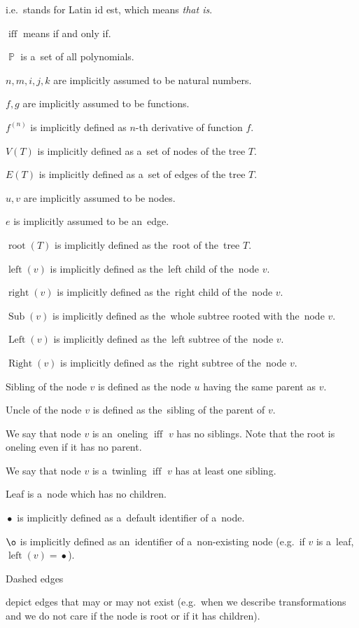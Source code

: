 \documentclass[final]{article}
\theoremstyle{definition}
\theoremstyle{definition}
\theoremstyle{remark}
\DeclareMathOperator{\textiff}{\text{iff}}
\DeclareMathOperator{\poly}{\mathbb{P}}
\DeclareMathOperator{\troot}{\text{root}}
\DeclareMathOperator{\tleft}{\text{left}}
\DeclareMathOperator{\tright}{\text{right}}
\DeclareMathOperator{\tLeft}{\text{Left}}
\DeclareMathOperator{\tRight}{\text{Right}}
\DeclareMathOperator{\tSub}{\text{Sub}}
\DeclareMathOperator{\n}{\bullet}
\DeclareMathOperator{\no}{\o}
\begin{document}
i.e.~stands for Latin id est, which means \textit{that is}.

\(\textiff\) means if and only if.

\(\poly\) is a~set of all polynomials.

\(n, m, i, j, k\) are implicitly assumed to be natural numbers.

\(f, g\) are implicitly assumed to be functions.

\(f^{(n)}\) is implicitly defined as \(n\)-th derivative of function \(f\).

\(V(T)\) is implicitly defined as a~set of nodes of the tree \(T\).

\(E(T)\) is implicitly defined as a~set of edges of the tree \(T\).

\(u, v\) are implicitly assumed to be nodes.

\(e\) is implicitly assumed to be an~edge.

\(\troot(T)\) is implicitly defined as the~root of the~tree \(T\).

\(\tleft(v)\) is implicitly defined as the~left child of the~node \(v\).

\(\tright(v)\) is implicitly defined as the~right child of the~node \(v\).

\(\tSub(v)\) is implicitly defined as the~whole subtree rooted with the~node \(v\).

\(\tLeft(v)\) is implicitly defined as the~left subtree of the~node \(v\).

\(\tRight(v)\) is implicitly defined as the~right subtree of the~node \(v\).

Sibling of the node \(v\) is defined as the node \(u\) having the same parent as \(v\).

Uncle of the node \(v\) is defined as the~sibling of the parent of \(v\).

We say that node \(v\) is an~oneling \(\textiff\) \(v\) has no siblings. Note that the root is oneling even if it has no parent.

We say that node \(v\) is a~twinling \(\textiff\) \(v\) has at least one sibling.

Leaf is a~node which has no children.

\(\n\) is implicitly defined as a~default identifier of a~node.

\(\no\) is implicitly defined as an~identifier of a~non-existing node (e.g.~if \(v\) is a~leaf, \(\tleft(v) = \n\)).

Dashed edges 
\begin{minipage}{1.5em}

\end{minipage}
depict edges that may or may not exist (e.g.~when we describe transformations and we do not care if the node is root or if it has children).
\end{document}
